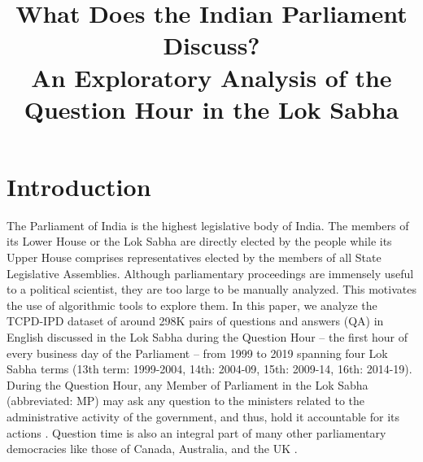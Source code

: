 \documentclass[10pt, a4paper]{article}
\title{What Does the Indian Parliament Discuss? \\An Exploratory Analysis of the Question Hour in the Lok Sabha
}
\begin{document}
\maketitleabstract

\section{Introduction}
The Parliament of India is the highest legislative body of India. The members of its Lower House or the Lok Sabha are directly elected by the people while its Upper House comprises representatives elected by the members of all State Legislative Assemblies. 
Although parliamentary proceedings are immensely useful to a political scientist, they are too large to be manually analyzed. This motivates the use of algorithmic tools to explore them.
In this paper, we analyze the TCPD-IPD dataset  of around 298K pairs of questions and answers (QA) in English discussed in the Lok Sabha during the Question Hour -- the first hour of every business day of the Parliament -- from 1999 to 2019 spanning four Lok Sabha terms (13th term: 1999-2004, 14th: 2004-09, 15th: 2009-14, 16th: 2014-19). 
During the Question Hour, any Member of Parliament in the Lok Sabha (abbreviated: MP) may ask any question to the ministers related to the administrative activity of the government, and thus,  hold it accountable for its actions \cite{sanyal2016regulating,tripathi21pandemic}. Question time is also an integral part of many other parliamentary democracies like those of Canada, Australia, and the UK \cite{martin2014roles}. 
\end{document}
